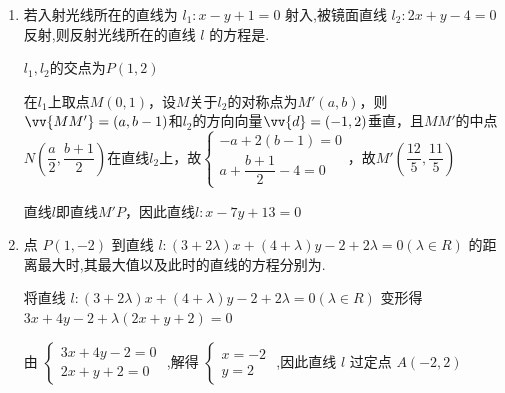 \begin{enumerate}
\begin{jieda}
        因为直线 $y = {ax} - 2$ 与直线 $y = \sqrt{3}x$ 的夹角 $\theta  \in  \left\lbrack  {0,\dfrac{\pi }{6}}\right)$，所以 $\tan \theta  = \left| \dfrac{{k}_{1} - {k}_{2}}{1 + {k}_{1}{k}_{2}}\right|  = \left| \dfrac{a - \sqrt{3}}{1 + \sqrt{3}a}\right|  \in  \left\lbrack  {0,\dfrac{\sqrt{3}}{3}}\right)$ ,即 $3{\left( a - \sqrt{3}\right) }^{2} < {\left( 1 + \sqrt{3}a\right) }^{2}$，解得 $a > \dfrac{\sqrt{3}}{3}$ .
    \end{jieda}

    \item 若入射光线所在的直线为 ${l}_{1} : x - y + 1 = 0$ 射入,被镜面直线 ${l}_{2} : {2x} + y - 4 = 0$ 反射,则反射光线所在的直线 $l$ 的方程是.
    \begin{jieda}
        $l_1, l_2$的交点为$P(1,2)$
        
        在$l_1$上取点$M(0, 1)$，设$M$关于$l_2$的对称点为$M'(a, b)$，则$\vv{MM'} = (a, b - 1)$和$l_2$的方向向量$\vv{d} = (-1, 2)$垂直，且$MM'$的中点$N\left(\dfrac{a}{2}, \dfrac{b+1}{2}\right)$在直线$l_2$上，故$\left\{\begin{array}{l}
             -a+2(b-1) = 0  \\
             a + \dfrac{b+1}{2} - 4 = 0
        \end{array}\right.$，故$M'\left(\dfrac{12}{5}, \dfrac{11}{5}\right)$

        直线$l$即直线$M'P$，因此直线$l: x-7y+13=0$
    \end{jieda}

    \item 点 $P\left( {1, - 2}\right)$ 到直线 $l : \left( {3 + {2\lambda }}\right) x + \left( {4 + \lambda }\right) y - 2 + {2\lambda } = 0\left( {\lambda  \in  {R}}\right)$ 的距离最大时,其最大值以及此时的直线的方程分别为.
    \begin{jieda}
        将直线 $l : \left( {3 + {2\lambda }}\right) x + \left( {4 + \lambda }\right) y - 2 + {2\lambda } = 0\left( {\lambda  \in  {R}}\right)$ 变形得 ${3x} + {4y} - 2 + \lambda \left( {{2x} + y + 2}\right)  = 0$
        
        由 $\left\{  \begin{array}{l} {3x} + {4y} - 2 = 0 \\  {2x} + y + 2 = 0 \end{array}\right.$ ,解得 $\left\{  \begin{array}{l} x =  - 2 \\  y = 2 \end{array}\right.$ ,因此直线 $l$ 过定点 $A\left( {-2,2}\right)$
        

\end{jieda}
\end{enumerate}
